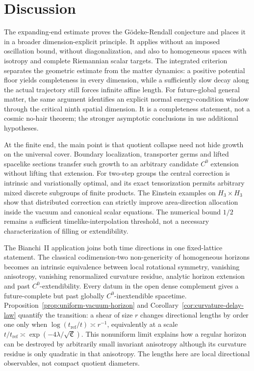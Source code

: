 \documentclass[10pt,a4paper]{article}
\numberwithin{equation}{section}
\theoremstyle{definition}
\theoremstyle{remark}
\begin{document}
\section{Discussion}

The expanding-end estimate proves the G\"odeke-Rendall conjecture and
places it in a broader dimension-explicit principle.  It applies without
an imposed oscillation bound, without diagonalization, and also to
homogeneous spaces with isotropy and complete Riemannian scalar targets.
The integrated criterion separates the geometric estimate from the
matter dynamics: a positive potential floor yields completeness in every
dimension, while a sufficiently slow decay along the actual trajectory
still forces infinite affine length.  For future-global general matter,
the same argument identifies an explicit normal energy-condition window
through the critical ninth spatial dimension.  It is a completeness
statement, not a cosmic no-hair theorem; the stronger asymptotic
conclusions in \cite{Rendall2004Scalar,Ringstrom2025} use additional
hypotheses.

At the finite end, the main point is that quotient collapse need not hide
growth on the universal cover.  Boundary localization, transporter germs
and lifted spacelike sections transfer such growth to an arbitrary
candidate $C^0$ extension without lifting that extension.  For two-step
groups the central correction is intrinsic and variationally optimal,
and its exact tensorization permits arbitrary mixed discrete subgroups of
finite products.  The Einstein examples on $H_3\times H_3$ show that
distributed correction can strictly improve area-direction allocation
inside the vacuum and canonical scalar equations.  The numerical bound
$1/2$ remains a sufficient timelike-interpolation threshold, not a
necessary characterization of filling or extendibility.

The Bianchi~II application joins both time directions in one fixed-lattice
statement.  The classical codimension-two non-genericity of homogeneous
horizons \cite{Siklos1978,ChruscielRendall1995} becomes an intrinsic
equivalence between local rotational symmetry, vanishing anisotropy,
vanishing renormalized curvature residue, analytic horizon extension and
past $C^0$-extendibility.  Every datum in the open dense complement gives
a future-complete but past globally $C^0$-inextendible spacetime.
Proposition~\ref{prop:uniform-vacuum-horizon} and
Corollary~\ref{cor:curvature-delay-law} quantify the transition: a shear
of size $r$ changes directional lengths by order one only when
$\log(t_{\mathrm{ref}}/t)\asymp r^{-1}$, equivalently at a scale
$t/t_{\mathrm{ref}}\asymp\exp(-4\lambda/\sqrt{\mathfrak C})$.  This
nonuniform limit explains how a regular horizon can be destroyed by
arbitrarily small invariant anisotropy although its curvature residue is
only quadratic in that anisotropy.  The lengths here are local
directional observables, not compact quotient diameters.
\end{document}

